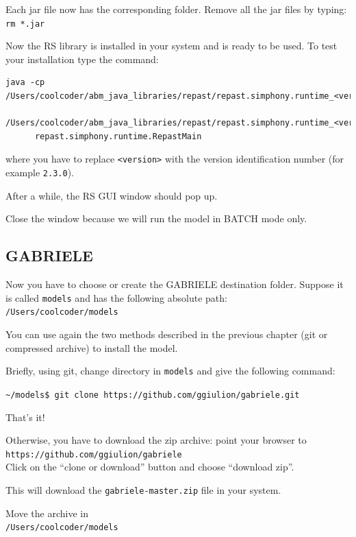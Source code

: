 \documentclass{book}
\begin{document}
Each jar file now has the corresponding folder.
Remove all the jar files by typing:\\
\verb+rm *.jar+

Now the RS library is installed in your system and is ready to be used.
To test your installation type the command:\\
\begin{verbatim}
java -cp /Users/coolcoder/abm_java_libraries/repast/repast.simphony.runtime_<version>/lib/*:
         /Users/coolcoder/abm_java_libraries/repast/repast.simphony.runtime_<version>/bin 
	  repast.simphony.runtime.RepastMain
\end{verbatim}
where you have to replace \verb+<version>+ with the version identification number (for example \verb+2.3.0+).

After a while, the RS GUI window should pop up.

Close the window because we will run the model in BATCH mode only.



\subsection{GABRIELE}

Now you have to choose or create the GABRIELE destination folder.
Suppose it is called \verb+models+ and has the following absolute path: \\
\verb+/Users/coolcoder/models+

You can use again the two methods described in the previous chapter (git or compressed archive) to install the model. 

Briefly, using git, change directory in \verb+models+ and give the following command:

\vskip2mm
\noindent\verb+~/models$ +\color{red}\verb+git clone https://github.com/ggiulion/gabriele.git+ \color{black}

\vskip2mm
That's it!

Otherwise, you have to download the zip archive: point your browser to\\ 
\verb+https://github.com/ggiulion/gabriele+\\
Click on the ``clone or download'' button and choose ``download zip''.

This will download the \verb+gabriele-master.zip+ file in your system.

Move the archive in\\
\verb+/Users/coolcoder/models+
\end{document}
